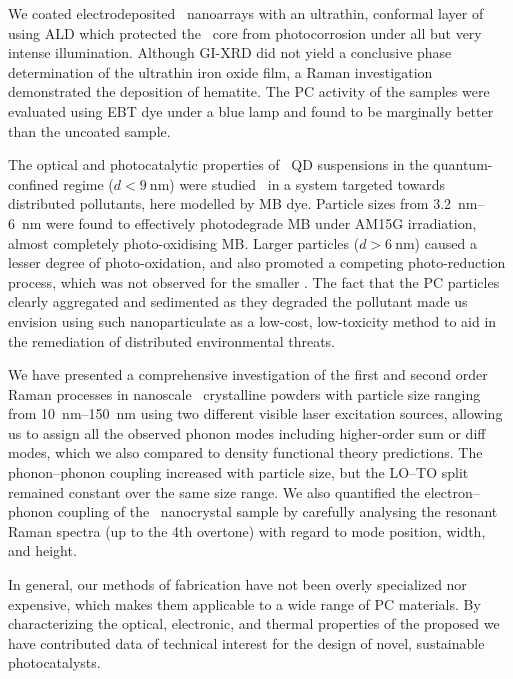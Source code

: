 \documentclass[webedition,openright,titles,swedish,english]{LuaUUThesis}\usepackage[]{graphicx}\usepackage[]{xcolor}
\begin{document}
We coated electrodeposited \ZnO\ nanoarrays with an ultrathin, conformal
layer of  using \gls{ALD} which protected the \ZnO\ core from
photocorrosion under all but very intense illumination.
Although \gls{GI-XRD} did not yield a conclusive phase determination of the ultrathin
iron oxide film, a Raman investigation demonstrated the deposition of hematite.
The \gls{PC} activity of the samples were evaluated using \gls{EBT} dye
under a blue lamp and found to be marginally better than the uncoated sample.


The optical and photocatalytic properties of \ZnO\ \gls{QD} suspensions in the
quantum-confined regime ($d<\qty{9}{\nm}$) were studied \insitu\ in a system
targeted towards distributed pollutants, here modelled by \gls{MB} dye.
Particle sizes from \qtyrange{3.2}{6}{\nm} were found to effectively
photodegrade \gls{MB} under \gls{AM15G} irradiation, almost
completely photo-oxidising \gls{MB}.
Larger particles ($d>\qty{6}{\nm}$) caused a lesser degree of photo-oxidation,
and also promoted a competing photo-reduction process, which was not observed
for the smaller .
The fact that the \gls{PC} particles clearly aggregated and sedimented as they
degraded the pollutant made us envision using such nanoparticulate 
as a low-cost, low-toxicity method to aid in the remediation of
distributed environmental threats.


We have presented a comprehensive investigation of the first and second order Raman processes
in nanoscale \ZnO\ crystalline powders with particle size ranging from \qtyrange{10}{150}{\nm}
using two different visible laser excitation sources, allowing us to assign all the observed
phonon modes including higher-order sum or diff modes, which we also compared
to density functional theory predictions.
The phonon--phonon coupling increased with particle size, but the LO--TO split
remained constant over the same size range.
We also quantified the electron--phonon coupling of the \ZnO\ nanocrystal sample
by carefully analysing the resonant Raman spectra (up to the 4th overtone) with
regard to mode position, width, and height.



In general, our methods of fabrication have not been overly specialized nor expensive,
which makes them applicable to a wide range of \gls{PC} materials.
By characterizing the optical, electronic, and thermal properties of the
proposed  we have contributed data of technical interest for
the design of novel, sustainable photocatalysts.
\end{document}
